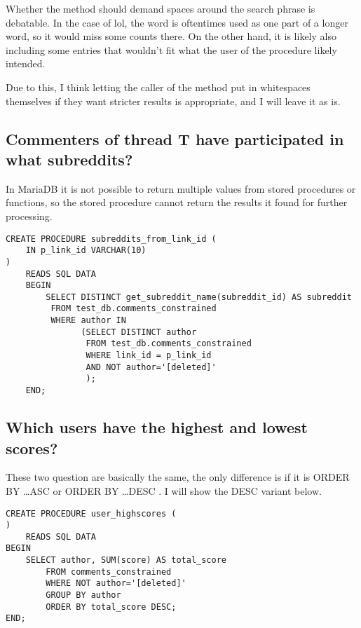     Whether the method should demand spaces around the search phrase is debatable.
    In the case of lol, the word is oftentimes used as one part of a longer word, so it would miss some counts there.
    On the other hand, it is likely also including some entries that wouldn't fit what the user of the procedure likely intended.

    Due to this, I think letting the caller of the method put in whitespaces themselves if they want stricter results is appropriate, and I will leave it as is.

    \subsection{Commenters of thread T have participated in what subreddits?}\label{subsec:what-subreddits}

    In MariaDB it is not possible to return multiple values from stored procedures or functions, so the stored procedure cannot return the results it found for further processing.

    \begin{verbatim}
CREATE PROCEDURE subreddits_from_link_id (
    IN p_link_id VARCHAR(10)
)
    READS SQL DATA
    BEGIN
        SELECT DISTINCT get_subreddit_name(subreddit_id) AS subreddit
         FROM test_db.comments_constrained
         WHERE author IN
               (SELECT DISTINCT author
                FROM test_db.comments_constrained
                WHERE link_id = p_link_id
                AND NOT author='[deleted]'
                );
    END;
    \end{verbatim}

    \subsection{Which users have the highest and lowest scores?} \label{subsec:user-high-low-scores}

    These two question are basically the same, the only difference is if it is ORDER BY \ldots ASC or ORDER BY \ldots DESC .
    I will show the DESC variant below.

    \begin{verbatim}
CREATE PROCEDURE user_highscores (
)
    READS SQL DATA
BEGIN
    SELECT author, SUM(score) AS total_score
        FROM comments_constrained
        WHERE NOT author='[deleted]'
        GROUP BY author
        ORDER BY total_score DESC;
END;
    \end{verbatim}

